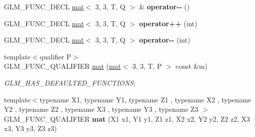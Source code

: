 \begin{DoxyCompactItemize}
\mbox{\label{structglm_1_1mat_3_013_00_013_00_01T_00_01Q_01_4_ae00b3ec3496cd413781d7169997f666f}} 
G\+L\+M\+\_\+\+F\+U\+N\+C\+\_\+\+D\+E\+CL \hyperlink{structglm_1_1mat}{mat}$<$ 3, 3, T, Q $>$ \& {\bfseries operator-\/-\/} ()
\item 
\mbox{\label{structglm_1_1mat_3_013_00_013_00_01T_00_01Q_01_4_a1c09b6fe99f20acf55ee20c1820ff0cd}} 
G\+L\+M\+\_\+\+F\+U\+N\+C\+\_\+\+D\+E\+CL \hyperlink{structglm_1_1mat}{mat}$<$ 3, 3, T, Q $>$ {\bfseries operator++} (int)
\item 
\mbox{\label{structglm_1_1mat_3_013_00_013_00_01T_00_01Q_01_4_a7d3a048df9c2f4e1ba2495b60655db4b}} 
G\+L\+M\+\_\+\+F\+U\+N\+C\+\_\+\+D\+E\+CL \hyperlink{structglm_1_1mat}{mat}$<$ 3, 3, T, Q $>$ {\bfseries operator-\/-\/} (int)
\item 
\mbox{\label{structglm_1_1mat_3_013_00_013_00_01T_00_01Q_01_4_ab0dc37093f2f938cfffeed36ad4183fa}} 
{\footnotesize template$<$qualifier P$>$ }\\G\+L\+M\+\_\+\+F\+U\+N\+C\+\_\+\+Q\+U\+A\+L\+I\+F\+I\+ER \hyperlink{structglm_1_1mat_3_013_00_013_00_01T_00_01Q_01_4_ab0dc37093f2f938cfffeed36ad4183fa}{mat} (\hyperlink{structglm_1_1mat}{mat}$<$ 3, 3, T, P $>$ const \&m)
\begin{DoxyCompactList}\small\item\em G\+L\+M\+\_\+\+H\+A\+S\+\_\+\+D\+E\+F\+A\+U\+L\+T\+E\+D\+\_\+\+F\+U\+N\+C\+T\+I\+O\+NS. \end{DoxyCompactList}\item 
\mbox{\label{structglm_1_1mat_3_013_00_013_00_01T_00_01Q_01_4_aea88e083c5a0901a32cc72d58f0ad8bb}} 
{\footnotesize template$<$typename X1, typename Y1, typename Z1 , typename X2 , typename Y2 , typename Z2 , typename X3 , typename Y3 , typename Z3 $>$ }\\G\+L\+M\+\_\+\+F\+U\+N\+C\+\_\+\+Q\+U\+A\+L\+I\+F\+I\+ER {\bfseries mat} (X1 x1, Y1 y1, Z1 z1, X2 x2, Y2 y2, Z2 z2, X3 x3, Y3 y3, Z3 z3)
\item 
\mbox{\label{structglm_1_1mat_3_013_00_013_00_01T_00_01Q_01_4_a8a14c1bc14232b6d479a6d1f63bf035a}} 

\end{DoxyCompactItemize}
